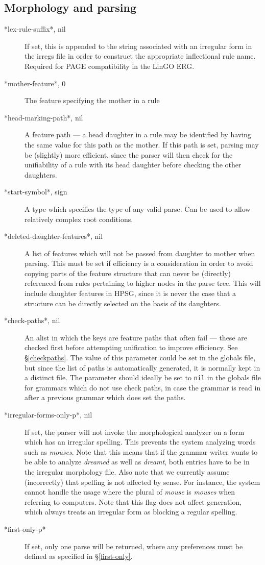 \documentclass[12pt]{report}
\begin{document}
\subsection{Morphology and parsing}
\label{mpglob}
\begin{description}
\item[*lex-rule-suffix*, nil]  If set, this is appended to
the string associated with an irregular form in the irregs file in
order to construct the appropriate inflectional rule name. 
Required for PAGE compatibility in the LinGO ERG.
\item[*mother-feature*, 0] The feature specifying the mother in a rule
\item[*head-marking-path*, nil] A feature path --- 
a head daughter in a rule may be identified by having the same 
value for this path as the mother.  If this path is set, parsing may be
(slightly) more efficient, since the parser will then check for the
unifiability of a rule with its
head daughter before checking the other daughters.
\item[*start-symbol*, sign] A type which specifies the type of any valid parse.
Can be used to allow relatively complex root conditions.
\item[*deleted-daughter-features*, nil]
A list of features which will not be passed from daughter to mother
when parsing.  This must be set if efficiency is a consideration in order
to avoid copying parts of the feature structure that can never be
(directly) referenced from rules pertaining to higher nodes in the
parse tree.  This will include daughter features in HPSG, since it is
never the case that a structure can be directly selected on the basis of
its daughters.
\item[*check-paths*, nil]
An alist in which the keys are feature paths that often fail ---
these are checked first before attempting unification to improve efficiency.
See \S\ref{checkpaths}.
The value of this parameter could be set in the globals file, but since the
list of paths is automatically generated, it is normally kept in a distinct
file.  The parameter should ideally 
be set to {\tt nil} in the globals file for
grammars which do not use check paths, in case the grammar is read in after
a previous grammar which does set the paths.
\item[*irregular-forms-only-p*, nil]
If set, the parser will not invoke the morphological analyzer on a
form which has an irregular spelling.  This prevents the system
analyzing words such as {\it mouses}.  Note that this means
that if the grammar writer wants to be able to analyze {\it dreamed} as
well as {\it dreamt}, both entries have to be in the irregular morphology
file.  Also note that we currently assume (incorrectly) that spelling is
not affected by sense. For instance, the system cannot handle
the usage where the plural
of {\it mouse} is {\it mouses} when referring to computers.
Note that this flag does not affect generation, which
always treats an irregular form as blocking a regular spelling.
\item[*first-only-p*] If set, only one parse will be returned,
where any preferences must be defined as specified
in \S\ref{first-only}. 
\end{description}
\end{document}
